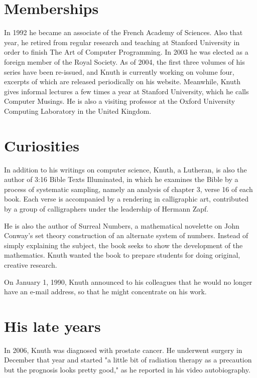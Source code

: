 \documentclass[10pt,letterpaper]{book}
\begin{document}
\chapter{Memberships}

In 1992 he became an associate of the French Academy of Sciences. Also
that year, he retired from regular research and teaching at Stanford 
University in order to finish The Art of Computer Programming. In 2003 
he was elected as a foreign member of the Royal Society. As of 2004, 
the first three volumes of his series have been re-issued, and Knuth is 
currently working on volume four, excerpts of which are released periodically 
on his website. Meanwhile, Knuth gives informal lectures a few times a 
year at Stanford University, which he calls Computer Musings. He is also a 
visiting professor at the Oxford University Computing Laboratory in the 
United Kingdom.

\chapter{Curiosities}

In addition to his writings on computer science, Knuth, a Lutheran, 
is also the author of 3:16 Bible Texts Illuminated, in which he 
examines the Bible by a process of systematic sampling, namely an 
analysis of chapter 3, verse 16 of each book. Each verse is accompanied 
by a rendering in calligraphic art, contributed by a group of calligraphers 
under the leadership of Hermann Zapf.

He is also the author of Surreal Numbers, a mathematical novelette 
on John Conway's set theory construction of an alternate system of 
numbers. Instead of simply explaining the subject, the book seeks to 
show the development of the mathematics. Knuth wanted the book to 
prepare students for doing original, creative research.

On January 1, 1990, Knuth announced to his colleagues that he would 
no longer have an e-mail address, so that he might concentrate on his work.

\chapter{His late years}

In 2006, Knuth was diagnosed with prostate cancer. He underwent surgery 
in December that year and started "a little bit of radiation therapy  
as a precaution but the prognosis looks pretty good," as he reported 
in his video autobiography.
\end{document}
